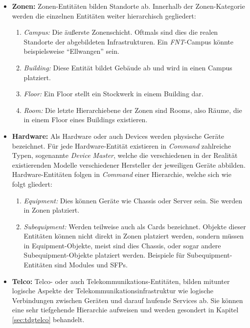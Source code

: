 \begin{itemize}
    \item \textbf{Zonen:} Zonen-Entitäten bilden Standorte ab. Innerhalb der Zonen-Kategorie werden die einzelnen Entitäten weiter hierarchisch gegliedert:
    \begin{enumerate}
        \item \textit{Campus:} Die äußerste Zonenschicht. Oftmals sind dies die realen Standorte der abgebildeten Infrastrukturen. Ein \textit{FNT}-Campus könnte beispielsweise \enquote{Ellwangen} sein.
        \item \textit{Building:} Diese Entität bildet Gebäude ab und wird in einen Campus platziert.
        \item \textit{Floor:} Ein Floor stellt ein Stockwerk in einem Building dar.
        \item \textit{Room:} Die letzte Hierarchiebene der Zonen sind Rooms, also Räume, die in einem Floor eines Buildings existieren.
    \end{enumerate}
    \item \textbf{Hardware:} Als Hardware oder auch Devices werden physische Geräte bezeichnet. Für jede Hardware-Entität existieren in \textit{Command} zahlreiche Typen, sogenannte \textit{Device Master}, welche die verschiedenen in der Realität existierenden Modelle verschiedener Hersteller der jeweiligen Geräte abbilden. Hardware-Entitäten folgen in \textit{Command} einer Hierarchie, welche sich wie folgt gliedert:
    \begin{enumerate}
        \item \textit{Equipment:} Dies können Geräte wie Chassis oder Server sein. Sie werden in Zonen platziert.
        \item \textit{Subequipment:} Werden teilweise auch als Cards bezeichnet. Objekte dieser Entitäten können nicht direkt in Zonen platziert werden, sondern müssen in Equipment-Objekte, meist sind dies Chassis, oder sogar andere Subequipment-Objekte platziert werden. Beispiele für Subequipment-Entitäten sind Modules und SFPs. 
    \end{enumerate}
    \item \textbf{Telco:} Telco- oder auch Telekommunikations-Entitäten, bilden mitunter logische Aspekte der Telekommunikationsinfrastruktur wie logische Verbindungen zwischen Geräten und darauf laufende Services ab. Sie können eine sehr tiefgehende Hierarchie aufweisen und werden gesondert in Kapitel \ref{sec:tdgtelco} behandelt.
\end{itemize}

